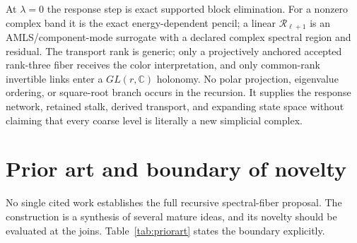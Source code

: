 \documentclass[11pt,letterpaper]{article}
\newcommand{\RN}{\mathcal{R}}
\begin{document}
At $\lambda=0$ the response step is exact supported block elimination. For a
nonzero complex band it is the exact energy-dependent pencil; a linear
$\RN_{\ell+1}$ is an AMLS/component-mode surrogate with a declared complex
spectral region and residual. The transport rank is generic; only a
projectively anchored accepted rank-three fiber receives the color
interpretation, and only common-rank invertible links enter a $GL(r,\mathbb C)$
holonomy. No polar projection, eigenvalue ordering, or square-root
branch occurs in the recursion. It supplies the response network, retained
stalk, derived transport, and expanding state space without claiming that
every coarse level is literally a new simplicial complex.

\section{Prior art and boundary of novelty}\label{sec:priorart}

No single cited work establishes the full recursive spectral-fiber proposal.
The construction is a synthesis of several mature ideas, and its novelty should
be evaluated at the joins. Table~\ref{tab:priorart} states the boundary
explicitly.
\end{document}
